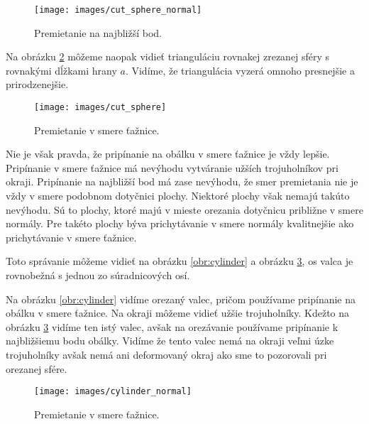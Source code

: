 \begin{figure}
    \centerline{\texttt{[image: images/cut\_sphere\_normal]}}
    \caption[Ohraničená triangulácia gule -- premietanie na najbližší bod]
    {Premietanie na najbližší bod.}
    \label{obr:cut_sphere_normal}
\end{figure}

Na obrázku \ref{obr:cut_sphere} môžeme naopak vidieť trianguláciu rovnakej zrezanej sféry s rovnakými 
dĺžkami hrany $a$.
Vidíme, že triangulácia vyzerá omnoho presnejšie a prirodzenejšie.

\begin{figure}
    \centerline{\texttt{[image: images/cut\_sphere]}}
    \caption[Ohraničená triangulácia gule -- premietanie v smere ťažnice]
    {Premietanie v smere ťažnice.}
    \label{obr:cut_sphere}
\end{figure}

Nie je však pravda, že pripínanie na obálku v smere ťažnice je vždy lepšie.
Pripínanie v smere ťažnice má nevýhodu vytváranie užších trojuholníkov pri 
okraji. Pripínanie na najbližší bod má zase nevýhodu, že smer premietania
nie je vždy v smere podobnom dotyčnici plochy.
Niektoré plochy však nemajú takúto nevýhodu.
Sú to plochy, ktoré majú v mieste orezania dotyčnicu približne v smere normály.
Pre takéto plochy býva prichytávanie v smere normály kvalitnejšie ako 
prichytávanie v smere ťažnice.

Toto správanie môžeme vidieť na obrázku \ref{obr:cylinder} a obrázku \ref{obr:cylinder_normal}, 
os valca je rovnobežná s jednou zo súradnicových osí.

Na obrázku \ref{obr:cylinder} vidíme orezaný valec, pričom používame
pripínanie na obálku v smere ťažnice. Na okraji môžeme vidieť užšie trojuholníky. 
Kdežto na obrázku \ref{obr:cylinder_normal} vidíme ten istý valec, 
avšak na orezávanie používame pripínanie k najbližšiemu bodu obálky.
Vidíme že tento valec nemá na okraji veľmi úzke trojuholníky avšak 
nemá ani deformovaný okraj ako sme to pozorovali pri orezanej sfére.

\begin{figure}
    \centerline{\texttt{[image: images/cylinder\_normal]}}
    \caption[Ohraničená triangulácia tetrahedronu -- premietanie na najbližší bod]
    {Premietanie v smere ťažnice.}
    \label{obr:cylinder_normal}
\end{figure}

